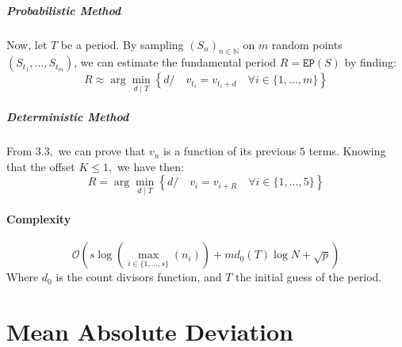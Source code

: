 \documentclass[]{article}
\begin{document}
\subsubsection{Probabilistic Method}
Now, let $T$ be a period. By sampling $(S_n)_{n\in\mathbb{N}}$ on $m$ random points $(S_{t_1},\dots,S_{t_m})$, we can estimate the fundamental period $R=\mathtt{EP}(S)$ by finding:
\begin{equation}\tag{2.1}
	\boxed{R\approx \arg\min_{d \mid T}\left\{d/\quad v_{t_i} = v_{t_i+d} \quad \forall i\in\{1,\dots,m\}\right\}}
\end{equation}
\subsubsection{Deterministic Method}
From $3.3,$ we can prove that $v_n$ is a function of its previous $5$ terms.
\newline
Knowing that the offset $K \leq 1,$ we have then:
 \begin{equation}\tag{2.2}
 	\boxed{R = \arg\min_{d \mid T}\left\{d/\quad v_{i} = v_{i+R} \quad \forall i\in\{1,\dots,5\}\right\}}
 	\end{equation}
\subsection{Complexity}
$$
\mathcal{O}\left(s\log\left(\max_{i\in\{1,\dots,s\}}(n_{i})\right)+md_0(T)\log N + \sqrt p\right)
$$
Where $d_0$ is the count divisors function, and $T$ the initial guess of the period. 

\pagebreak
\part{Mean Absolute Deviation}
\end{document}
